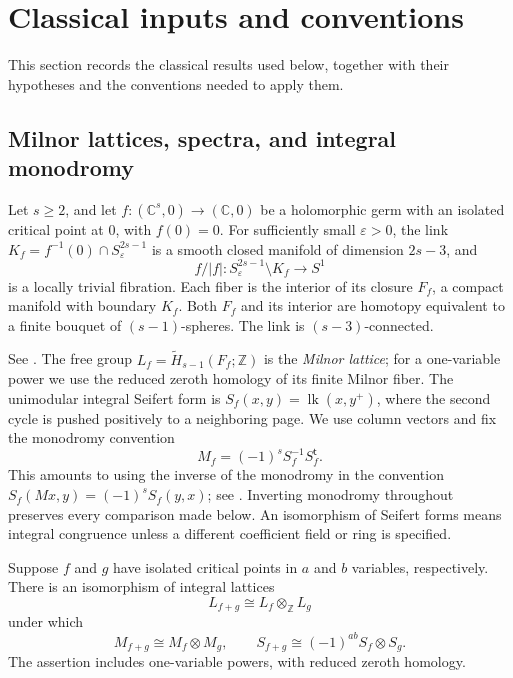 \section{Classical inputs and conventions}\label{sec:background}

This section records the classical results used below, together with their
hypotheses and the conventions needed to apply them.
\subsection{Milnor lattices, spectra, and integral monodromy}

\begin{theorem}[Milnor]\label{bg:milnor}
Let $s\geq2$, and let $f:(\mathbb C^s,0)\to(\mathbb C,0)$ be a holomorphic germ with an isolated
critical point at $0$, with $f(0)=0$.  For sufficiently small $\varepsilon>0$, the link
$K_f=f^{-1}(0)\cap S^{2s-1}_\varepsilon$ is a smooth closed manifold of
dimension $2s-3$, and
\[
 f/|f|:S^{2s-1}_\varepsilon\setminus K_f\longrightarrow S^1
\]
is a locally trivial fibration.  Each fiber is the interior of its closure
$F_f$, a compact manifold with boundary $K_f$.  Both $F_f$ and its interior
are homotopy equivalent to a finite bouquet of $(s-1)$-spheres.
The link is $(s-3)$-connected.
\end{theorem}

See \cite[Theorems~4.8, 5.2, and~6.5, and Lemma~6.1]{Milnor1968}.
The free group $L_f=\widetilde H_{s-1}(F_f;\mathbb Z)$ is the
\emph{Milnor lattice}; for a one-variable power we use the reduced
zeroth homology of its finite Milnor fiber.  The unimodular integral Seifert form is
$S_f(x,y)=\operatorname{lk}(x,y^+)$, where the second cycle is pushed
positively to a neighboring page.
We use column vectors and fix the monodromy convention
\begin{equation}\label{eq:bg-monodromy}
 M_f=(-1)^sS_f^{-1}S_f^{\mathsf t}.
\end{equation}
This amounts to using the inverse of the monodromy in the convention
$S_f(Mx,y)=(-1)^sS_f(y,x)$; see
\cite[Section~6, Equations~(6.1)--(6.2)]{BalnojanHertling2019}.
Inverting monodromy throughout preserves every comparison made below.
An isomorphism of Seifert forms means integral congruence unless a different
coefficient field or ring is specified.

\begin{theorem}\label{bg:ts}
Suppose $f$ and $g$ have isolated critical points in $a$ and $b$ variables,
respectively.  There is an isomorphism of integral lattices
\[
 L_{f+g}\cong L_f\otimes_{\mathbb Z}L_g
\]
under which
\[
 M_{f+g}\cong M_f\otimes M_g,
 \qquad
 S_{f+g}\cong(-1)^{ab}S_f\otimes S_g.
\]
The assertion includes one-variable powers, with reduced zeroth homology.
\end{theorem}

